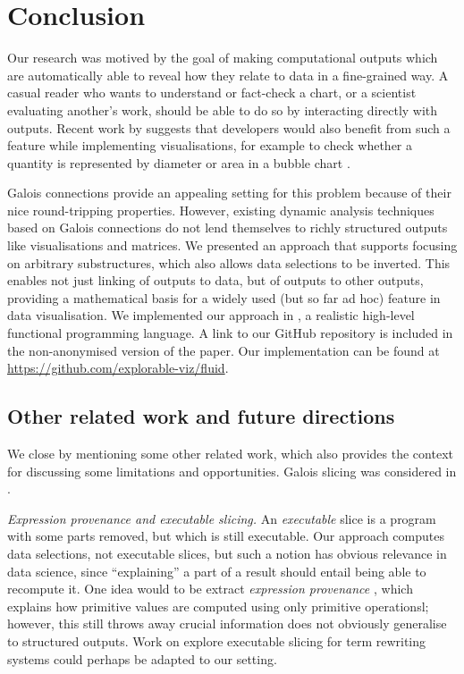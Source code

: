 \section{Conclusion}
\label{sec:conclusion}

Our research was motived by the goal of making computational outputs which are automatically able to reveal how they relate to data in a fine-grained way. A casual reader who wants to understand or fact-check a chart, or a scientist evaluating another's work, should be able to do so by interacting directly with outputs. Recent work by \citeauthor{walny19} suggests that developers would also benefit from such a feature while implementing visualisations, for example to check whether a quantity is represented by diameter or area in a bubble chart \cite{walny19}.

Galois connections provide an appealing setting for this problem because of their nice round-tripping properties. However,  existing dynamic analysis techniques based on Galois connections do not lend themselves to richly structured outputs like visualisations and matrices. We presented an approach that supports focusing on arbitrary substructures, which also allows data selections to be inverted. This enables not just linking of outputs to data, but of outputs to other outputs, providing a mathematical basis for a widely used (but so far ad hoc) feature in data visualisation. We implemented our approach in \OurLanguage, a realistic high-level functional programming language. %
\ifanonymous%
   A link to our GitHub repository is included in the non-anonymised version of the paper.
\else%
   Our implementation can be found at \url{https://github.com/explorable-viz/fluid}.%
\fi%

\subsection{Other related work and future directions}
\label{sec:conclusion:other-related-work}

We close by mentioning some other related work, which also provides the context for discussing some limitations and opportunities. Galois slicing \cite{perera12a,ricciotti17,perera16d} was considered in .

\emph{Expression provenance and executable slicing.} An \emph{executable} slice \cite{hall95} is a program with some parts removed, but which is still executable. Our approach computes data selections, not executable slices, but such a notion has obvious relevance in data science, since ``explaining'' a part of a result should entail being able to recompute it. One idea would to be extract \emph{expression provenance} \cite{acar12}, which explains how primitive values are computed using only primitive operationsl; however, this still throws away crucial information does not obviously generalise to structured outputs. Work on explore executable slicing for term rewriting systems \cite{field98} could perhaps be adapted to our setting.

